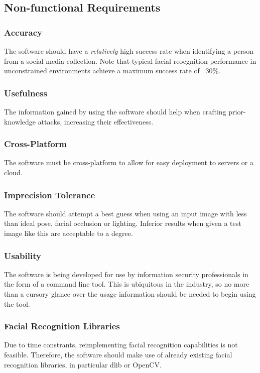 \documentclass[12pt]{article}
\begin{document}
\subsection{Non-functional Requirements}
\subsubsection{Accuracy}
The software should have a \textit{relatively} high success rate when identifying a person from a social media collection. Note that typical facial reocgnition performance in unconstrained environments achieve a maximum success rate of ~30\%.

\subsubsection{Usefulness}
The information gained by using the software should help when crafting prior-knowledge attacks, increasing their effectiveness.

\subsubsection{Cross-Platform}
The software must be cross-platform to allow for easy deployment to servers or a cloud.

\subsubsection{Imprecision Tolerance}
The software should attempt a best guess when using an input image with less than ideal pose, facial occlusion or lighting. Inferior results when given a test image like this are acceptable to a degree.

\subsubsection{Usability}
The software is being developed for use by information security professionals in the form of a command line tool. This is ubiquitous in the industry, so no more than a cursory glance over the usage information should be needed to begin using the tool.

\subsubsection{Facial Recognition Libraries}
Due to time constrants, reimplementing facial recognition capabilities is not feasible. Therefore, the software should make use of already existing facial recognition libraries, in particular dlib or OpenCV.
\end{document}
